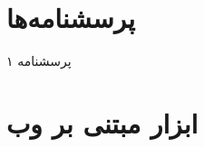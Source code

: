     
\let\Chapter\chapter
    
\chapter{پرسشنامه‌ها}
\label{app:questionnaires}
پرسشنامه ۱
% 
% 


\chapter{ابزار مبتنی بر وب}

